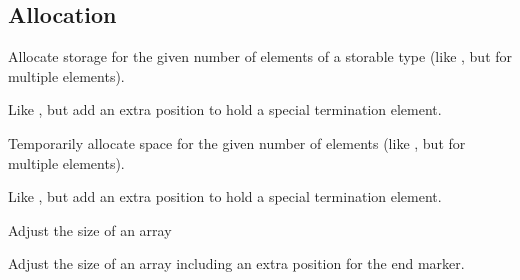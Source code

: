 \subsection{Allocation}
\begin{haddockdesc}
\item[\begin{tabular}{@{}l}
mallocArray :: Storable a => Int -> IO (Ptr a)
\end{tabular}]
{\haddockbegindoc
Allocate storage for the given number of elements of a storable type
 (like , but for multiple elements).\par}
\end{haddockdesc}
\begin{haddockdesc}
\item[\begin{tabular}{@{}l}
mallocArray0 :: Storable a => Int -> IO (Ptr a)
\end{tabular}]
{\haddockbegindoc
Like , but add an extra position to hold a special
 termination element.\par}
\end{haddockdesc}
\begin{haddockdesc}
\item[\begin{tabular}{@{}l}
allocaArray :: Storable a => Int -> (Ptr a -> IO b) -> IO b
\end{tabular}]
{\haddockbegindoc
Temporarily allocate space for the given number of elements
 (like , but for multiple elements).\par}
\end{haddockdesc}
\begin{haddockdesc}
\item[\begin{tabular}{@{}l}
allocaArray0 :: Storable a => Int -> (Ptr a -> IO b) -> IO b
\end{tabular}]
{\haddockbegindoc
Like , but add an extra position to hold a special
 termination element.\par}
\end{haddockdesc}
\begin{haddockdesc}
\item[\begin{tabular}{@{}l}
reallocArray :: Storable a => Ptr a -> Int -> IO (Ptr a)
\end{tabular}]
{\haddockbegindoc
Adjust the size of an array\par}
\end{haddockdesc}
\begin{haddockdesc}
\item[\begin{tabular}{@{}l}
reallocArray0 :: Storable a => Ptr a -> Int -> IO (Ptr a)
\end{tabular}]
{\haddockbegindoc
Adjust the size of an array including an extra position for the end marker.\par}
\end{haddockdesc}
